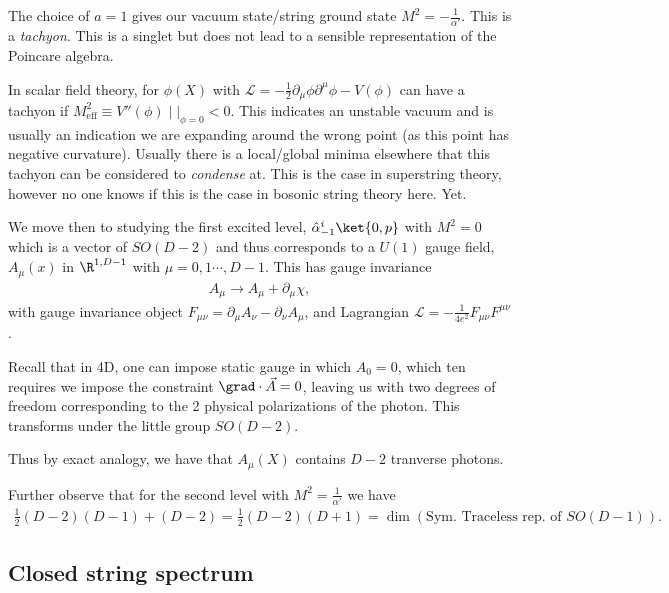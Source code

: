 
The choice of $a = 1$ gives our vacuum state/string ground state $M^2 = -\frac{1}{\alpha'}$. This is a \emph{tachyon}. This is a singlet but does not lead to a sensible representation of the Poincare algebra.

In scalar field theory, for $\phi \left( X \right) $ with $\mathcal{L} = -\frac{1}{2} \partial_\mu \phi \partial^{\mu} \phi - V\left( \phi \right) $
can have a tachyon if $M^2_\text{eff} \equiv V'' \left( \phi \right)  \mid|_{\phi = 0} < 0$. This indicates an unstable vacuum and is usually an indication we are expanding around the wrong point (as this point has negative curvature). Usually there is a local/global minima elsewhere that this tachyon can be considered to \emph{condense} at. This is the case in superstring theory, however no one knows if this is the case in bosonic string theory here. Yet.

We move then to studying the first excited level, $\hat{\alpha}_{-1}^{i} \ket{0, p}$ with $M^2 = 0$ which is a vector of $SO \left( D-2 \right) $ and thus corresponds to a $U \left( 1 \right) $ gauge field, $A_\mu \left( x \right) $ in $\R^{1, D - 1}$ with $\mu = 0, 1 \cdots, D - 1$. This has gauge invariance
\begin{align}
    A_\mu \to A_\mu + \partial_\mu \chi
,\end{align}
with gauge invariance object $F_{\mu \nu} = \partial_\mu A_\nu - \partial_\nu A_\mu$, and Lagrangian $\mathcal{L} = -\frac{1}{4e^2} F_{\mu \nu} F^{\mu \nu}$.

Recall that in 4D, one can impose static gauge in which $A_0 = 0$, which ten requires we impose the constraint $\grad \cdot \vec{A} = 0$, leaving us with two degrees of freedom corresponding to the 2 physical polarizations of the photon. This transforms under the little group  $SO \left( D - 2 \right) $.

Thus by exact analogy, we have that $A_\mu \left( X \right) $ contains $D - 2$ tranverse photons.

Further observe that for the second level with $M^2 = \frac{1}{\alpha'}$ we have
\begin{align}
    \frac{1}{2} \left( D - 2 \right) \left( D - 1 \right)  + \left( D - 2 \right) = \frac{1}{2} \left( D - 2 \right) \left( D + 1 \right) = \dim \left( \text{Sym. Traceless rep. of } SO \left( D - 1 \right)  \right) 
.\end{align}

\subsection{Closed string spectrum}

